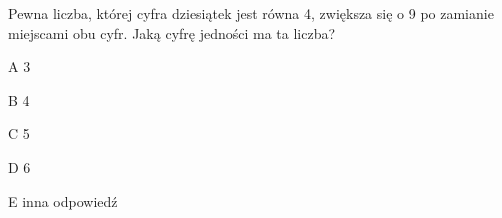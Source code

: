 \begin{tresc}
Pewna liczba, której cyfra dziesiątek jest równa 4, zwiększa się o 9 po zamianie miejscami obu cyfr. Jaką cyfrę jedności ma ta liczba?
\end{tresc}
\begin{wariant}{A} 3 \end{wariant}
\begin{wariant}{B} 4 \end{wariant}
\begin{wariant}{C} 5 \end{wariant}
\begin{wariant}{D} 6 \end{wariant}
\begin{wariant}{E} inna odpowiedź \end{wariant}
